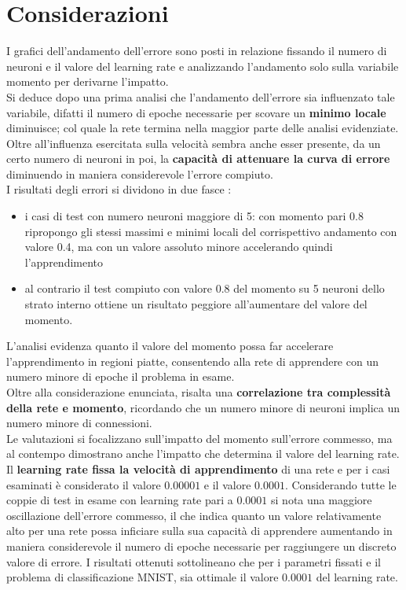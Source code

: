 \section{Considerazioni}
I grafici dell'andamento dell'errore sono posti in relazione fissando il numero di neuroni e il valore del learning rate e analizzando l'andamento solo sulla variabile momento per derivarne l'impatto.\\
Si deduce dopo una prima analisi che l'andamento dell'errore sia influenzato tale variabile, difatti il numero di epoche necessarie per scovare un \textbf{minimo locale} diminuisce; col quale la rete termina nella maggior parte delle analisi evidenziate.\\
Oltre all'influenza esercitata sulla velocità sembra anche esser presente, da un certo numero di neuroni in poi, la \textbf{capacità di attenuare la curva di errore} diminuendo in maniera considerevole l'errore compiuto.\\
I risultati degli errori si dividono in due fasce :
\begin{itemize}
    \item i casi di test con numero neuroni maggiore di 5: con momento pari 0.8 ripropongo gli stessi massimi e minimi locali del corrispettivo andamento con valore 0.4, ma con un valore assoluto minore accelerando quindi l'apprendimento
    \item al contrario il test compiuto con valore 0.8 del momento su 5 neuroni dello strato interno ottiene un risultato peggiore all'aumentare del valore del momento.
\end{itemize}
L'analisi evidenza quanto il valore del momento possa far accelerare l'apprendimento in regioni piatte, consentendo alla rete di apprendere con un numero minore di epoche il problema in esame.\\
Oltre alla considerazione enunciata, risalta una \textbf{correlazione tra complessità della rete e momento}, ricordando che un numero minore di neuroni implica un numero minore di connessioni. \\
Le valutazioni si focalizzano sull'impatto del momento sull'errore commesso, ma al contempo dimostrano anche l'impatto che determina il valore del learning rate. Il \textbf{learning rate fissa la velocità di apprendimento} di una rete e per i casi esaminati è considerato il valore $0.00001$ e il valore $0.0001$. Considerando tutte le coppie di test in esame con learning rate pari a $0.0001$ si nota una maggiore oscillazione dell'errore commesso, il che indica quanto un valore relativamente alto per una rete possa inficiare sulla sua capacità di apprendere aumentando in maniera considerevole il numero di epoche necessarie per raggiungere un discreto valore di errore. I risultati ottenuti sottolineano che per i parametri fissati e il problema di classificazione MNIST, sia ottimale il valore $0.0001$ del learning rate.  